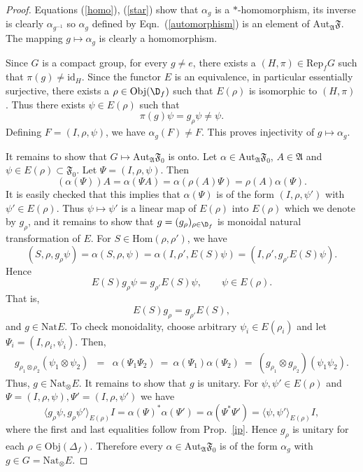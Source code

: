 \documentclass[11pt]{article}
\newcommand{\alg}[1]{\mathfrak{#1}}
\theoremstyle{definition}
\theoremstyle{definition}
\theoremstyle{remark}
\newcommand{\Obj}{\mathrm{Obj}}
\def\a{\alpha} \def\b{\beta} \def\g{\gamma} \def\d{\delta}
\newcommand{\Hom}{\mathrm{Hom}}
\newcommand{\Aut}{\mathrm{Aut}}
\newcommand{\Rep}{\mathrm{Rep}}
\def\id{\mathrm{id}}
\newcommand{\Nat}{\mathrm{Nat}}
\begin{document}
\begin{proof}
Equations (\ref{homo}), (\ref{star}) show that $\alpha _g$ is a $*$-homomorphism, its
inverse is clearly $\alpha _{g^{-1}}$ so $\alpha _g$ defined by Eqn.\
(\ref{automorphism}) is an element of $\Aut _{\alg{A}}\alg{F}$.  The mapping $g\mapsto
\alpha _g$ is clearly a homomorphism.  

Since $G$ is a compact group, for every $g\neq e$, there exists a $(H, \pi ) \in \Rep
_fG$ such that $\pi (g)\neq \id _H$.  Since the functor $E$ is an equivalence, in
particular essentially surjective, there exists a $\rho \in \Obj (\D _f)$ such that
$E(\rho )$ is isomorphic to $(H,\pi )$.  Thus there exists $\psi \in E(\rho )$ such
that $$ \pi (g)\psi =g_{\rho}\psi \neq \psi .$$ Defining $F=(I,\rho ,\psi )$, we have
$\a _g(F)\neq F$.  This proves injectivity of $g\mapsto \a _g$. 

It remains to show that $G\mapsto \Aut _{\alg{A}}\alg{F}_0$ is onto.  Let $\alpha \in
\Aut _{\alg{A}}\alg{F}_0$, $A\in \alg{A}$ and $\psi \in E(\rho )\subset \alg{F}_0$.
Let $\Psi =(I,\rho ,\psi )$.  Then
$$ (\alpha (\Psi ))A = \alpha (\Psi A) = \alpha (\rho (A)\Psi )=\rho (A)\alpha (\Psi
).$$ It is easily checked that this implies that $\alpha (\Psi )$ is of the form
$(I,\rho ,\psi ')$ with $\psi '\in E(\rho )$.  Thus $\psi \mapsto \psi '$ is a linear
map of $E(\rho )$ into $E(\rho )$ which we denote by $g_\rho $, and it remains to
show that $g=(g_\rho )_{\rho \in \D _f}$ is monoidal natural transformation of $E$.
For $S\in \Hom (\rho ,\rho ')$, we have
$$ (S,\rho ,g_\rho \psi )=\alpha (S,\rho ,\psi )=\alpha (I,\rho ',E(S)\psi )=(I,\rho' ,g_{\rho '}E(S)\psi
) .$$ Hence
$$ E(S)g_\rho \psi =g_{\rho '}E(S)\psi ,\qquad \psi \in E(\rho ).$$
That is,
$$ E(S)g_\rho =g_{\rho '}E(S),$$
and $g\in \Nat E$.  To check monoidality, choose arbitrary $\psi _i\in E(\rho _i)$
and let $\Psi _i=(I,\rho _i,\psi _i)$.  Then,
\begin{eqnarray*} g_{\rho _1\otimes \rho _2}(\psi _1\otimes \psi _2) &=& \alpha (\Psi
  _1\Psi _2)\:=\:\alpha (\Psi _1)\alpha (\Psi _2)\:=\:(g_{\rho _1}\otimes g_{\rho
    _2})(\psi _1\psi _2 ) .
\end{eqnarray*} Thus,
$g\in \Nat _{\otimes}E$.  It remains to show that $g$ is unitary.  For $\psi ,\psi '\in
E(\rho )$ and $\Psi =(I,\rho ,\psi ),\Psi '=(I,\rho ,\psi ')$ we have
$$ \big\langle g_\rho \psi ,g_\rho \psi '\big\rangle _{E(\rho )}I =\alpha (\Psi )^*\alpha (\Psi ') =\alpha (\Psi
^*\Psi ') =\bigl\langle \psi ,\psi '\bigr\rangle _{E(\rho )}I ,$$ where the first and
last equalities follow from Prop.\ \ref{ip}.  Hence $g_\rho $ is unitary for each
$\rho \in \Obj (\Delta _f)$.  Therefore every $\a \in \Aut _{\alg{A}}\alg{F}_0$ is of
the form $\a _g$ with $g\in G=\Nat _{\otimes }E$.
\end{proof}
\end{document}
